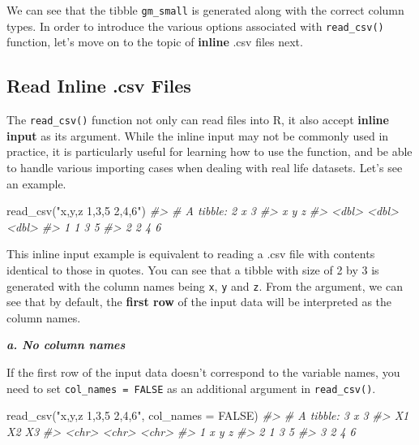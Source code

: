 \documentclass[
]{book}
\newenvironment{Shaded}{\begin{snugshade}}{\end{snugshade}}
\newcommand{\AttributeTok}[1]{\textcolor[rgb]{0.77,0.63,0.00}{#1}}
\newcommand{\CommentTok}[1]{\textcolor[rgb]{0.56,0.35,0.01}{\textit{#1}}}
\newcommand{\ConstantTok}[1]{\textcolor[rgb]{0.00,0.00,0.00}{#1}}
\newcommand{\FunctionTok}[1]{\textcolor[rgb]{0.00,0.00,0.00}{#1}}
\newcommand{\NormalTok}[1]{#1}
\newcommand{\StringTok}[1]{\textcolor[rgb]{0.31,0.60,0.02}{#1}}
\begin{document}
We can see that the tibble \texttt{gm\_small} is generated along with the correct column types. In order to introduce the various options associated with \texttt{read\_csv()} function, let's move on to the topic of \textbf{inline} .csv files next.

\hypertarget{read-inline-.csv-files}{%
\subsection{Read Inline .csv Files}\label{read-inline-.csv-files}}

The \texttt{read\_csv()} function not only can read files into R, it also accept \textbf{inline input} as its argument. While the inline input may not be commonly used in practice, it is particularly useful for learning how to use the function, and be able to handle various importing cases when dealing with real life datasets. Let's see an example.

\begin{Shaded}
\begin{Highlighting}[]
\FunctionTok{read\_csv}\NormalTok{(}\StringTok{"x,y,z}
\StringTok{          1,3,5}
\StringTok{          2,4,6"}\NormalTok{)}
\CommentTok{\#\textgreater{} \# A tibble: 2 x 3}
\CommentTok{\#\textgreater{}       x     y     z}
\CommentTok{\#\textgreater{}   \textless{}dbl\textgreater{} \textless{}dbl\textgreater{} \textless{}dbl\textgreater{}}
\CommentTok{\#\textgreater{} 1     1     3     5}
\CommentTok{\#\textgreater{} 2     2     4     6}
\end{Highlighting}
\end{Shaded}

This inline input example is equivalent to reading a .csv file with contents identical to those in quotes. You can see that a tibble with size of 2 by 3 is generated with the column names being \texttt{x}, \texttt{y} and \texttt{z}. From the argument, we can see that by default, the \textbf{first row} of the input data will be interpreted as the column names.

\textbf{\emph{a. No column names}}

If the first row of the input data doesn't correspond to the variable names, you need to set \texttt{col\_names\ =\ FALSE} as an additional argument in \texttt{read\_csv()}.

\begin{Shaded}
\begin{Highlighting}[]
\FunctionTok{read\_csv}\NormalTok{(}\StringTok{"x,y,z}
\StringTok{          1,3,5}
\StringTok{          2,4,6"}\NormalTok{, }\AttributeTok{col\_names =} \ConstantTok{FALSE}\NormalTok{)}
\CommentTok{\#\textgreater{} \# A tibble: 3 x 3}
\CommentTok{\#\textgreater{}   X1    X2    X3   }
\CommentTok{\#\textgreater{}   \textless{}chr\textgreater{} \textless{}chr\textgreater{} \textless{}chr\textgreater{}}
\CommentTok{\#\textgreater{} 1 x     y     z    }
\CommentTok{\#\textgreater{} 2 1     3     5    }
\CommentTok{\#\textgreater{} 3 2     4     6}
\end{Highlighting}
\end{Shaded}
\end{document}
